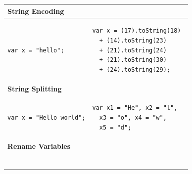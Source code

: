 			
			\begin{table}
				\begin{tabular}{|p{0.473\textwidth}|p{}|} \hline
					\multicolumn{2}{|l|}{\textbf{String Encoding}} \\ \hline
					\begin{lstlisting}
var x = "hello";
					\end{lstlisting} &
					\begin{lstlisting}
var x = (17).toString(18) 
  + (14).toString(23) 
  + (21).toString(24) 
  + (21).toString(30) 
  + (24).toString(29);	
					\end{lstlisting} \\ \hline
					\multicolumn{2}{|l|}{\textbf{String Splitting}} \\ \hline
					\begin{lstlisting}
var x = "Hello world";
					\end{lstlisting} &
					\begin{lstlisting}
var x1 = "He", x2 = "l", 
  x3 = "o", x4 = "w", 
  x5 = "d";
					\end{lstlisting} \\ \hline
					\multicolumn{2}{|l|}{\textbf{Rename Variables}} \\ \hline
					\begin{lstlisting}
					\end{lstlisting} &
					\begin{lstlisting}
					\end{lstlisting} \\ \hline
				\end{tabular}
			\end{table}
			
			
			
			
		
